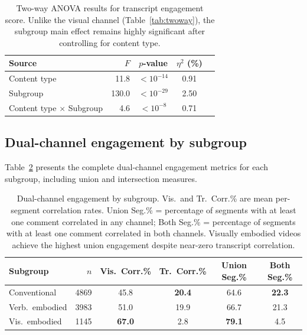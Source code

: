 \documentclass[fleqn,10pt]{wlscirep}
\begin{document}
\begin{table}[ht]
    \centering
    \caption{Two-way ANOVA results for transcript engagement score. Unlike the visual channel (Table~\ref{tab:twoway}), the subgroup main effect remains highly significant after controlling for content type.}
    \label{tab:twoway_tr}
    \begin{tabular}{lrccc}
        \toprule
        Source & $F$ & $p$-value & $\eta^2$ (\%) \\
        \midrule
        Content type & 11.8 & $< 10^{-14}$ & 0.91 \\
        Subgroup & 130.0 & $< 10^{-29}$ & 2.50 \\
        Content type $\times$ Subgroup & 4.6 & $< 10^{-8}$ & 0.71 \\
        \bottomrule
    \end{tabular}
\end{table}


\subsection*{Dual-channel engagement by subgroup}

Table~\ref{tab:subgroup_dual} presents the complete dual-channel engagement metrics for each subgroup, including union and intersection measures.

\begin{table}[ht]
    \centering
    \caption{Dual-channel engagement by subgroup. Vis.\ and Tr.\ Corr.\% are mean per-segment correlation rates. Union Seg.\% = percentage of segments with at least one comment correlated in any channel; Both Seg.\% = percentage of segments with at least one comment correlated in both channels. Visually embodied videos achieve the highest union engagement despite near-zero transcript correlation.}
    \label{tab:subgroup_dual}
    \begin{tabular}{lrcccc}
        \toprule
        Subgroup & $n$ & Vis.\ Corr.\% & Tr.\ Corr.\% & Union Seg.\% & Both Seg.\% \\
        \midrule
        Conventional & 4869 & 45.8 & \textbf{20.4} & 64.6 & \textbf{22.3} \\
        Verb.\ embodied & 3983 & 51.0 & 19.9 & 66.7 & 21.3 \\
        Vis.\ embodied & 1145 & \textbf{67.0} & 2.8 & \textbf{79.1} & 4.5 \\
        \bottomrule
    \end{tabular}
\end{table}
\end{document}
